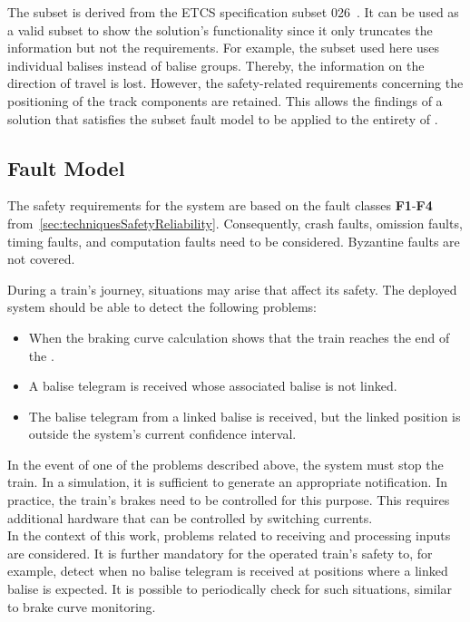 The subset is derived from the ETCS specification subset 026~\cite{ETCS26}.
It can be used as a valid subset to show the solution's functionality since it only truncates the information but not the requirements.
For example, the subset used here uses individual balises instead of balise groups.
Thereby, the information on the direction of travel is lost.
However, the safety-related requirements concerning the positioning of the track components are retained.
This allows the findings of a solution that satisfies the subset fault model to be applied to the entirety of .

\subsection{Fault Model}
\label{subsec:faultModel}
The safety requirements for the system are based on the fault classes \textbf{F1}-\textbf{F4} from~\autoref{sec:techniquesSafetyReliability}\cite{CristianFaultModel}.
Consequently, crash faults, omission faults, timing faults, and computation faults need to be considered.
Byzantine faults are not covered.

During a train's journey, situations may arise that affect its safety.
The deployed system should be able to detect the following problems:

\begin{itemize}
\item When the braking curve calculation shows that the train reaches the end of the .
\item A balise telegram is received whose associated balise is not linked.
\item The balise telegram from a linked balise is received, but the linked position is outside the system's current confidence interval.
\end{itemize}

In the event of one of the problems described above, the system must stop the train.
In a simulation, it is sufficient to generate an appropriate notification.
In practice, the train's brakes need to be controlled for this purpose.
This requires additional hardware that can be controlled by switching currents.
\\

In the context of this work, problems related to receiving and processing inputs are considered.
It is further mandatory for the operated train's safety to, for example, detect when no balise telegram is received at positions where a linked balise is expected.
It is possible to periodically check for such situations, similar to brake curve monitoring.

